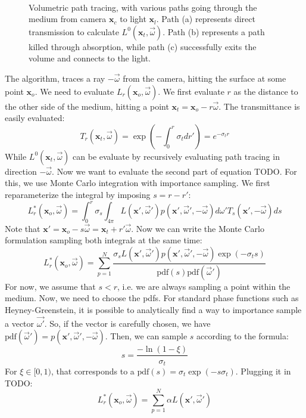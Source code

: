 \begin{figure}
\centering
   \def\svgwidth{0.7\textwidth}
    \\
\caption{Volumetric path tracing, with various paths going through the medium from camera $\mathbf{x}_c$ to light $\mathbf{x}_l$. Path (a) represents direct transmission to calculate $L^0(\mathbf{x}_t, \vec{\omega})$. Path (b) represents a path killed through absorption, while path (c) successfully exits the volume and connects to the light.} 
\label{fig:vpt}
\end{figure}

The algorithm, traces a ray $-\vec{\omega}$ from the camera, hitting the surface at some point $\mathbf{x}_o$. We need to evaluate $L_r(\mathbf{x}_o, \vec{\omega})$. We first evaluate $r$ as the distance to the other side of the medium, hitting a point $\mathbf{x}_t = \mathbf{x}_o - r \vec{\omega}$. The transmittance is easily evaluated:
$$
T_r(\mathbf{x}_t, \vec{\omega}) = \exp\left(-\int_0^r \sigma_t dr'\right) = e^{-\sigma_t r}
$$
While $L^0(\mathbf{x}_t, \vec{\omega})$ can be evaluate by recursively evaluating path tracing in direction $-\vec{\omega}$. Now we want to evaluate the second part of equation TODO. For this, we use Monte Carlo integration with importance sampling. We first reparameterize the integral by imposing $s = r - r'$:
$$
L_r^*(\mathbf{x}_o, \vec{\omega}) = \int_0^r \sigma_s \int_{4\pi} L(\mathbf{x}', \vec{\omega}') p(\mathbf{x}', \vec{\omega}', -\vec{\omega})  d\omega' T_{s}(\mathbf{x}', -\vec{\omega})  ds
$$
Note that $\mathbf{x}' = \mathbf{x}_o - s \vec{\omega} = \mathbf{x}_t + r' \vec{\omega}$. Now we can write the Monte Carlo formulation sampling both integrals at the same time:
$$
L_r^*(\mathbf{x}_o, \vec{\omega}) = \sum_{p=1}^N \frac{\sigma_s L(\mathbf{x}', \vec{\omega}') p(\mathbf{x}', \vec{\omega}', -\vec{\omega}) \exp(-\sigma_t s)}{\text{pdf}(s) \text{pdf}(\vec{\omega}')}
$$
For now, we assume that $s < r$, i.e. we are always sampling a point within the medium. Now, we need to choose the pdfs. For standard phase functions such as Heyney-Greenstein, it is possible to analytically find a way to importance sample a vector $\vec{\omega'}$. So, if the vector is carefully chosen, we have $\text{pdf}(\vec{\omega}') = p(\mathbf{x}', \vec{\omega}', -\vec{\omega})$. Then, we can sample $s$ according to the formula:
$$
s = \frac{-\ln(1 - \xi)}{\sigma_t}
$$
For $\xi \in [0,1)$, that corresponds to a $\text{pdf}(s) = \sigma_t \exp(-s \sigma_t)$. Plugging it in TODO:
$$
L_r^*(\mathbf{x}_o, \vec{\omega}) = \sum_{p=1}^N \alpha L(\mathbf{x}', \vec{\omega}')
$$
